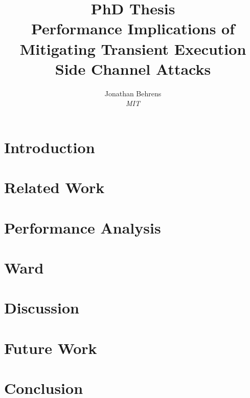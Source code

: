 \documentclass[letterpaper,12pt,oneside]{book}
\begin{document}
\date{\vspace{-\baselineskip}}
\title{\bf PhD Thesis \\ \large Performance Implications of Mitigating Transient Execution Side Channel Attacks}
\author{ {\rm Jonathan Behrens} \\ \textit{MIT} }
\maketitle

\tableofcontents

\chapter{Introduction}


\chapter{Related Work}



\chapter{Performance Analysis}







\chapter{Ward}










\chapter{Discussion}

\chapter{Future Work}


\chapter{Conclusion}



\pagebreak
{}

\end{document}

